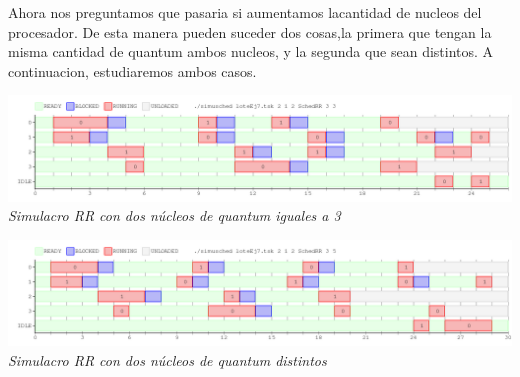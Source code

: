 Ahora nos preguntamos que pasaria si aumentamos lacantidad de nucleos del procesador.
De esta manera pueden suceder dos cosas,la primera que tengan la misma cantidad de quantum ambos nucleos, y la segunda que sean distintos.
A continuacion, estudiaremos ambos casos.\\
\vspace{\baselineskip}
\begin{center}
\includegraphics[scale=0.45]{../tp1/Test/resEj7Co2.png}
\\
\vspace{1pt}
\footnotesize\textit{Simulacro RR con dos n\'ucleos de quantum iguales a 3}
\end{center}
\vspace{\baselineskip}

\vspace{\baselineskip}
\begin{center}
\includegraphics[scale=0.45]{../tp1/Test/resEj7Co2dis.png}
\\
\vspace{1pt}
\footnotesize\textit{Simulacro RR con dos n\'ucleos de quantum distintos}
\end{center}
\vspace{\baselineskip}


